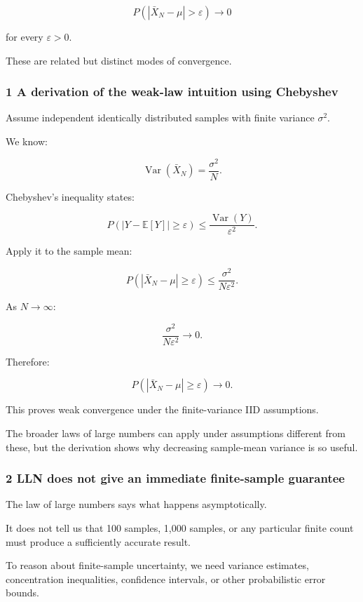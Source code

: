 \[
 \boxed{ P(|\bar X_N-\mu|>\varepsilon) \longrightarrow0 }
\]

for every \(\varepsilon>0\).

These are related but distinct modes of convergence.

\subsubsection{1 A derivation of the weak-law intuition using Chebyshev}\label{02-foundations-ii-ch030-a-derivation-of-the-weak-law-intuition-using-chebyshev}

Assume independent identically distributed samples with finite variance \(\sigma^2\).

We know:

\[
 \operatorname{Var}(\bar X_N)=\frac{\sigma^2}{N}.
\]

Chebyshev's inequality states:

\[
 P(|Y-\mathbb E[Y]|\ge\varepsilon) \le \frac{\operatorname{Var}(Y)}{\varepsilon^2}.
\]

Apply it to the sample mean:

\[
 P(|\bar X_N-\mu|\ge\varepsilon) \le \frac{\sigma^2}{N\varepsilon^2}.
\]

As \(N\to\infty\):

\[
 \frac{\sigma^2}{N\varepsilon^2}\to0.
\]

Therefore:

\[
 \boxed{ P(|\bar X_N-\mu|\ge\varepsilon)\to0 }.
\]

This proves weak convergence under the finite-variance IID assumptions.

The broader laws of large numbers can apply under assumptions different from these, but the derivation shows why decreasing sample-mean variance is so useful.

\subsubsection{2 LLN does not give an immediate finite-sample guarantee}\label{02-foundations-ii-ch030-lln-does-not-give-an-immediate-finite-sample-guarantee}

The law of large numbers says what happens asymptotically.

It does not tell us that 100 samples, 1,000 samples, or any particular finite count must produce a sufficiently accurate result.

To reason about finite-sample uncertainty, we need variance estimates, concentration inequalities, confidence intervals, or other probabilistic error bounds.

